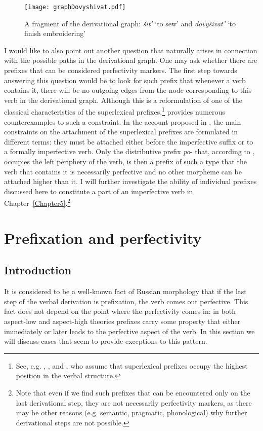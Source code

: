 \begin{figure}
\begin{center}
\texttt{[image: graphDovyshivat.pdf]}
\caption{A fragment of the derivational graph: \textit{\v{s}it'} `to sew' and \textit{dovy\v{s}ivat'} `to finish embroidering'\label{tree:dovyshivat}}
\end{center}
\end{figure}		

I would like to also point out another question that naturally arises in connection with the possible paths in the derivational graph. One may ask whether there are prefixes that can be considered perfectivity markers. The first step towards answering this question would be to look for such prefix that whenever a verb contains it, there will be no outgoing edges from the node corresponding to this verb in the derivational graph. Although this is a reformulation of one of the classical characteristics of the superlexical prefixes,\footnote{See, e.g. \citet{Ramchand:04}, \citet{Svenonius:04a}, and \citet{Romanova:06}, who assume that superlexical prefixes occupy the highest position in the verbal structure.} \citet{Tatevosov:07, Tatevosov:09} provides numerous counterexamples to such a constraint. In the account proposed in \citealt{Tatevosov:09}, the main constraints on the attachment of the superlexical prefixes are formulated in different terms: they must be attached either before the imperfective suffix or to a formally imperfective verb. Only the distributive prefix \textit{po}- that, according to \citet{Tatevosov:09}, occupies the left periphery of the verb, is then a prefix of such a type that the verb that contains it is necessarily perfective and no other morpheme can be attached higher than it. I will further investigate the ability of individual prefixes discussed here to constitute a part of an imperfective verb in Chapter~\ref{Chapter5}.\footnote{Note that even if we find such prefixes that can be encountered only on the last derivational step, they are not necessarily perfectivity markers, as there may be other reasons (e.g. semantic, pragmatic, phonological) why further derivational steps are not possible.}

\section{Prefixation and perfectivity}\label{section:new:perfectivity}

\subsection{Introduction}
It is considered to be a well-known fact of Russian morphology that if the last step of the verbal derivation is prefixation, the verb comes out perfective. This fact does not depend on the point where the perfectivity comes in: in both aspect-low \citep[][among others]{Verkuyl:95, Pinon:01, Ramchand:04} and aspect-high \citep{Paslawska:03, Gronn:10, Tatevosov:11} theories prefixes carry some property that either immediately or later leads to the perfective aspect of the verb. In this section we will discuss cases that seem to provide exceptions to this pattern.

